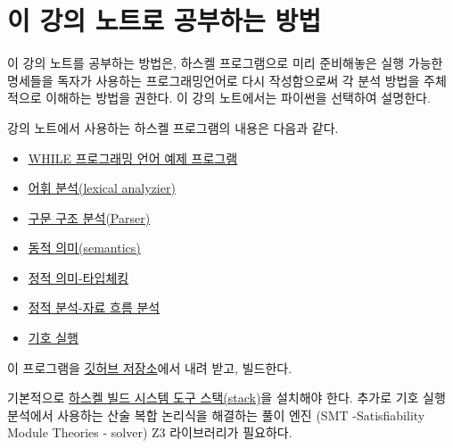 \documentclass[a4paper]{book}
\begin{document}
\section{이 강의 노트로 공부하는 방법}

이 강의 노트를 공부하는 방법은, 하스켈 프로그램으로 미리 준비해놓은
실행 가능한 명세들을 독자가 사용하는 프로그래밍언어로 다시
작성함으로써 각 분석 방법을 주체적으로 이해하는 방법을 권한다. 이 강의
노트에서는 파이썬을 선택하여 설명한다. 

강의 노트에서 사용하는 하스켈 프로그램의 내용은 다음과 같다.

\begin{itemize}
\item \href{https://github.com/kwanghoon/Lecture_SAV/tree/master/whilelang/example}{WHILE 프로그래밍 언어 예제 프로그램}
\item \href{https://github.com/kwanghoon/Lecture_SAV/blob/master/whilelang/app/Lexer.hs}{어휘 분석(lexical analyzier)}
\item \href{https://github.com/kwanghoon/Lecture_SAV/blob/master/whilelang/app/Parser.hs}{구문 구조 분석(Parser)}
\item \href{https://github.com/kwanghoon/Lecture_SAV/blob/master/whilelang/app/interp/Interp.hs}{동적 의미(semantics)}
\item \href{https://github.com/kwanghoon/Lecture_SAV/blob/master/whilelang/app/typecheck/Typecheck.hs}{정적 의미-타입체킹}
\item \href{https://github.com/kwanghoon/Lecture_SAV/blob/master/whilelang/app/dataflow/Dataflow.hs}{정적 분석-자료 흐름 분석}
\item \href{https://github.com/kwanghoon/Lecture_SAV/blob/master/whilelang/app/symexec/SymExec.hs}{기호 실행}
\end{itemize}

이 프로그램을 \href{https://github.com/kwanghoon/Lecture_SAV}{깃허브
  저장소}에서 내려 받고,
%
빌드한다.

기본적으로
\href{https://docs.haskellstack.org/en/stable/install_and_upgrade/}{하스켈
  빌드 시스템 도구 스택(stack)}을 설치해야 한다.
%
추가로 기호 실행 분석에서 사용하는 산술 복합 논리식을 해결하는 풀이
엔진 (SMT -Satisfiability Module Theories - solver) Z3 라이브러리가
필요하다.
\end{document}
